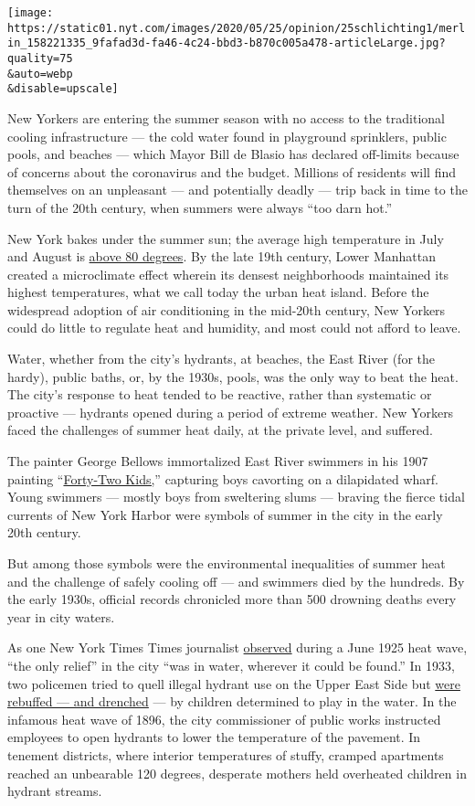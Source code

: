 \texttt{[image: https://static01.nyt.com/images/2020/05/25/opinion/25schlichting1/merlin\_158221335\_9fafad3d-fa46-4c24-bbd3-b870c005a478-articleLarge.jpg?quality=75\\\&auto=webp\\\&disable=upscale]}

New Yorkers are entering the summer season with no access to the
traditional cooling infrastructure --- the cold water found in
playground sprinklers, public pools, and beaches --- which Mayor Bill de
Blasio has declared off-limits because of concerns about the coronavirus
and the budget. Millions of residents will find themselves on an
unpleasant --- and potentially deadly --- trip back in time to the turn
of the 20th century, when summers were always ``too darn hot.''

New York bakes under the summer sun; the average high temperature in
July and August is
\href{https://www.weather.gov/okx/CentralParkHistorical}{above 80
degrees}. By the late 19th century, Lower Manhattan created a
microclimate effect wherein its densest neighborhoods maintained its
highest temperatures, what we call today the urban heat island. Before
the widespread adoption of air conditioning in the mid-20th century, New
Yorkers could do little to regulate heat and humidity, and most could
not afford to leave.

Water, whether from the city's hydrants, at beaches, the East River (for
the hardy), public baths, or, by the 1930s, pools, was the only way to
beat the heat. The city's response to heat tended to be reactive, rather
than systematic or proactive --- hydrants opened during a period of
extreme weather. New Yorkers faced the challenges of summer heat daily,
at the private level, and suffered.

The painter George Bellows immortalized East River swimmers in his 1907
painting
``\href{https://www.nga.gov/collection/art-object-page.134485.html}{Forty-Two
Kids,}'' capturing boys cavorting on a dilapidated wharf. Young swimmers
--- mostly boys from sweltering slums --- braving the fierce tidal
currents of New York Harbor were symbols of summer in the city in the
early 20th century.

But among those symbols were the environmental inequalities of summer
heat and the challenge of safely cooling off --- and swimmers died by
the hundreds. By the early 1930s, official records chronicled more than
500 drowning deaths every year in city waters.

As one New York Times Times journalist
\href{https://timesmachine.nytimes.com/timesmachine/1925/06/07/98830729.html?pageNumber=1}{observed}
during a June 1925 heat wave, ``the only relief'' in the city ``was in
water, wherever it could be found.'' In 1933, two policemen tried to
quell illegal hydrant use on the Upper East Side but
\href{https://timesmachine.nytimes.com/timesmachine/1933/06/10/119445643.html?pageNumber=3}{were
rebuffed --- and drenched} --- by children determined to play in the
water. In the infamous heat wave of 1896, the city commissioner of
public works instructed employees to open hydrants to lower the
temperature of the pavement. In tenement districts, where interior
temperatures of stuffy, cramped apartments reached an unbearable 120
degrees, desperate mothers held overheated children in hydrant streams.

